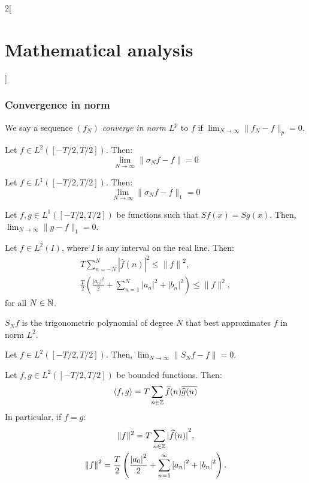 \documentclass[../../../main.tex]{subfiles}
\begin{document}
\begin{multicols}{2}[\section{Mathematical analysis}]
  \subsubsection{Convergence in norm}
  \begin{definition}
    We say a sequence $(f_N)$ \emph{converge in norm $L^p$} to $f$ if $\displaystyle\lim_{N\to\infty}\|f_N-f\|_p=0$.
  \end{definition}
  \begin{theorem}
    Let $f\in L^2([-T/2,T/2])$. Then: $$\lim_{N\to\infty}\|\sigma_Nf-f\|=0$$
  \end{theorem}
  \begin{corollary}
    Let $f\in L^1([-T/2,T/2])$. Then: $$\lim_{N\to\infty}\|\sigma_Nf-f\|_1=0$$
  \end{corollary}
  \begin{corollary}
    Let $f,g\in L^1([-T/2,T/2])$ be functions such that $Sf(x)=Sg(x)$. Then, $\displaystyle\lim_{N\to\infty}\|g-f\|_1=0$.
  \end{corollary}
  \begin{theorem}
    Let $f\in L^2(I)$, where $I$ is any interval on the real line. Then: \begin{gather*}T\sum_{n=-N}^N{|\widehat{f}(n)|}^2\leq{\|f\|}^2,\\\frac{T}{2}\left(\frac{{|a_0|}^2}{2}+\sum_{n=1}^N{|a_n|}^2+{|b_n|}^2\right)\leq \|f\|^2,\end{gather*} for all $N\in\mathbb{N} $.
  \end{theorem}
  \begin{theorem}
    $S_Nf$ is the trigonometric polynomial of degree $N$ that best approximates $f$ in norm $L^2$.
  \end{theorem}
  \begin{corollary}
    Let $f\in L^2([-T/2,T/2])$. Then, $\displaystyle\lim_{N\to\infty}\|S_Nf-f\|=0$.
  \end{corollary}
  \begin{theorem}
    Let $f,g\in L^2([-T/2,T/2])$ be bounded functions. Then: $$\langle f,g\rangle=T\sum_{n\in\mathbb{Z} }\widehat{f}(n)\overline{\widehat{g}(n)}$$
    In particular, if $f=g$:
    \begin{gather*}\|f\|^2=T\sum_{n\in\mathbb{Z} }{|\widehat{f}(n)|}^2,\\{\|f\|}^2=\frac{T}{2}\left(\frac{{|a_0|}^2}{2}+\sum_{n=1}^\infty{|a_n|}^2+{|b_n|}^2\right).\end{gather*}
  \end{theorem}

\end{multicols}
\end{document}
